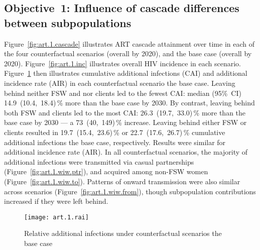 \subsection{Objective~1: Influence of cascade differences between subpopulations}\label{art.res.1}
Figure~\ref{fig:art.1.cascade} illustrates ART cascade attainment over time
in each of the four counterfactual scenarios (\casmd overall by 2020),
and the base case (\cashi overall by 2020).
Figure~\ref{fig:art.1.inc} illustrates overall HIV incidence in each scenario.
Figure~\ref{fig:art.1.rai} then illustrates
cumulative additional infections (CAI) and additional incidence rate (AIR)
in each counterfactual scenario \vs the base case.
Leaving behind neither FSW and nor clients led to the fewest CAI: median (95\%~CI)
14.9~(10.4,~18.4)\,\% more than the base case by 2030. %
By contrast, leaving behind both FSW and clients led to the most CAI:
26.3~(19.7,~33.0)\,\% more than the base case by 2030 %
--- a 73~(40,~149)\,\% increase. %
Leaving behind either FSW or clients resulted in
19.7~(15.4,~23.6)\,\% or 22.7~(17.6,~26.7)\,\% cumulative additional infections
\vs the base case, respectively. %
Results were similar for additional incidence rate (AIR).
In all counterfactual scenarios, the majority of additional infections were
transmitted via casual partnerships (Figure~\ref{fig:art.1.wiw.ptr}), %
and acquired among non-FSW women (Figure~\ref{fig:art.1.wiw.to}). %
Patterns of onward transmission were also similar across scenarios %
(Figure~\ref{fig:art.1.wiw.from}),
though subpopulation contributions increased if they were left behind.
\begin{figure}[h]
  \centering\texttt{[image: art.1.rai]}
  \caption{Relative additional infections under counterfactual scenarios \vs the base case}
  \label{fig:art.1.rai}
\end{figure}
